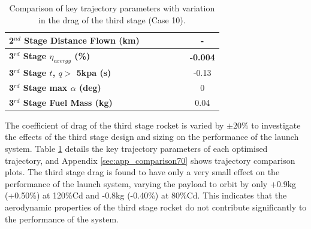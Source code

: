 \begin{table}[ht]
\begin{tabular}{l c c c c c c}
		\textbf{2$^{nd}$ Stage Distance Flown (km)}
		& \SecondDistCdThreeEightyNoReturn
		& \SecondDistCdThreeNinetyNoReturn
		& \SecondDistCdThreeStandardNoReturn
		& \SecondDistCdThreeOneHundredTenNoReturn
		& \SecondDistCdThreeOneHundredTwentyNoReturn
		& -
		\\
		\hline 
		\textbf{3$^{rd}$ Stage $\eta_{exergy}$ (\%)}
		& \textbf{\thirddExergyEffCdThreeEightyNoReturn}
		& \textbf{\thirddExergyEffCdThreeNinetyNoReturn}
		& \textbf{\thirddExergyEffCdThreeStandardNoReturn}
		& \textbf{\thirddExergyEffCdThreeOneHundredTenNoReturn}
		& \textbf{\thirddExergyEffCdThreeOneHundredTwentyNoReturn}
		& \textbf{-0.004}
		\\
	
		\textbf{3$^{rd}$ Stage $t$, $q >$ 5kpa (s)}
		& \thirdqOverFiveCdThreeEightyNoReturn
		& \thirdqOverFiveCdThreeNinetyNoReturn
		& \thirdqOverFiveCdThreeStandardNoReturn
		& \thirdqOverFiveCdThreeOneHundredTenNoReturn
		& \thirdqOverFiveCdThreeOneHundredTwentyNoReturn
		&-0.13
		\\
		\textbf{3$^{rd}$ Stage max $\alpha$ (deg)}
		& \thirdmaxAoACdThreeEightyNoReturn
		& \thirdmaxAoACdThreeNinetyNoReturn
		& \thirdmaxAoACdThreeStandardNoReturn
		& \thirdmaxAoACdThreeOneHundredTenNoReturn
		& \thirdmaxAoACdThreeOneHundredTwentyNoReturn
		&0
		\\
		\textbf{3$^{rd}$ Stage Fuel Mass (kg)}
		& \thirdmFuelCdThreeEightyNoReturn
		& \thirdmFuelCdThreeNinetyNoReturn
		& \thirdmFuelCdThreeStandardNoReturn
		& \thirdmFuelCdThreeOneHundredTenNoReturn
		& \thirdmFuelCdThreeOneHundredTwentyNoReturn
		&0.04
		\\
		\hline 
	\end{tabular} 
	\caption{Comparison of key trajectory parameters with variation in the drag of the third stage (Case 10).}
	\label{tab:comparison70}
	
\end{table}

The coefficient of drag of the third stage rocket is varied by $\pm20\%$ to investigate the effects of the third stage design and sizing on the performance of the launch system. Table \ref{tab:comparison70} details the key trajectory parameters of each optimised trajectory, and Appendix \ref{sec:app_comparison70} shows trajectory comparison plots. The third stage drag is found to have only a very small effect on the performance of the launch system, varying the payload to orbit by only +0.9kg (+0.50\%) at 120\%Cd and -0.8kg (-0.40\%) at 80\%Cd. This indicates that the aerodynamic properties of the third stage rocket do not contribute significantly to the performance of the system. 

